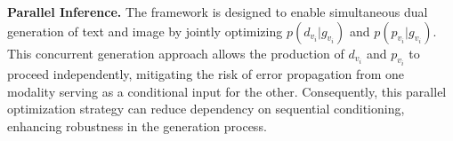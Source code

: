 


\noindent
\textbf{Parallel Inference.} 
The framework is designed to enable simultaneous dual generation of text and image by jointly optimizing $p(d_{v_i}|g_{v_i})$ and $p(p_{v_i}|g_{v_i})$.
This concurrent generation approach allows the production of $d_{v_i}$ and $p_{v_i}$ to proceed independently, mitigating the risk of error propagation from one modality serving as a conditional input for the other. 
Consequently, this parallel optimization strategy can reduce dependency on sequential conditioning, enhancing robustness in the generation process.

